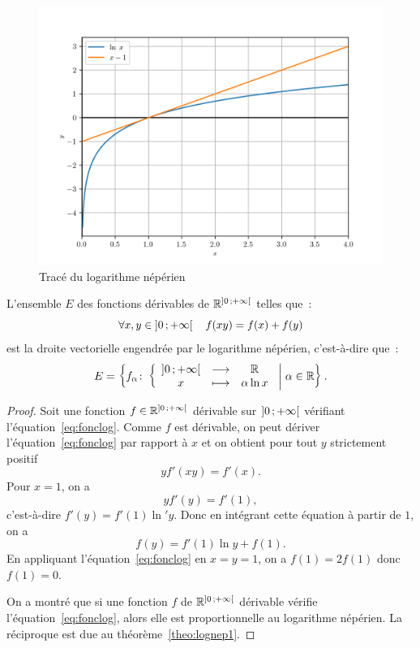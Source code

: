 %
\begin{figure}
  \centering
  \includegraphics[scale=0.6]{lognep.png}
  \caption{Tracé du logarithme népérien}
  \label{fig:traceln}
\end{figure}
%
\begin{theo}
  L'ensemble \(E\) des fonctions dérivables de \(\mathbb{R}^{\left] 0 \, ;  +\infty \right[}\) telles que~:
  \begin{equation}
    \label{eq:fonclog}
    \forall x, y \in \left] 0 \, ;  +\infty \right[ \quad f(xy)=f(x)+f(y)
  \end{equation}
  est la droite vectorielle engendrée par le logarithme népérien, c'est-à-dire que~:
  \begin{equation}
    E=\left\{f_{\alpha}\colon \left\{\begin{array}{ccc} \left] 0 \, ;  +\infty \right[ & \longrightarrow &\mathbb{R}\\ x & \longmapsto & \alpha \ln x \end{array} \right.\mathrel{}\middle|\mathrel{}\alpha \in \mathbb{R}\right\}.
  \end{equation}
\end{theo}
\begin{proof}
  Soit une fonction \(f \in \mathbb{R}^{\left] 0 \, ;  +\infty \right[}\) dérivable sur \(\left] 0 \, ;  +\infty \right[\) vérifiant l'équation~\eqref{eq:fonclog}. Comme \(f\) est dérivable, on peut dériver l'équation~\eqref{eq:fonclog} par rapport à \(x\) et on obtient pour tout \(y\) strictement positif
  \begin{equation}
    y f'(xy)=f'(x).
  \end{equation}
  Pour \(x=1\), on a
  \begin{equation}
    y f'(y)=f'(1),
  \end{equation}
  c'est-à-dire \(f'(y)=f'(1) \ln' y\). Donc en intégrant cette équation à partir de \(1\), on a
  \begin{equation}
    f(y)=f'(1)\ln y + f(1).
  \end{equation}
  En appliquant l'équation~\eqref{eq:fonclog} en \(x=y=1\), on a \(f(1)=2f(1)\) donc \(f(1)=0\).

  On a montré que si une fonction \(f\) de \(\mathbb{R}^{\left] 0 \, ;  +\infty \right[}\) dérivable vérifie l'équation~\eqref{eq:fonclog}, alors elle est proportionnelle au logarithme népérien. La réciproque est due au théorème~\ref{theo:lognep1}.
\end{proof}
%
